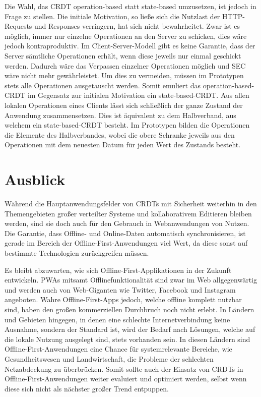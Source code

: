 \documentclass[a4paper, 12pt]{scrreprt}
\begin{document}
Die Wahl, das CRDT operation-based statt state-based umzusetzen, ist jedoch in Frage zu stellen. Die initiale Motivation, so ließe sich die Nutzlast der HTTP-Requests und Responses verringern, hat sich nicht bewahrheitet. Zwar ist es möglich, immer nur einzelne Operationen an den Server zu schicken, dies wäre jedoch kontraproduktiv. Im Client-Server-Modell gibt es keine Garantie, dass der Server sämtliche Operationen erhält, wenn diese jeweils nur einmal geschickt werden. Dadurch wäre das Verpassen einzelner Operationen möglich und \ac{SEC} wäre nicht mehr gewährleistet. Um dies zu vermeiden, müssen im Prototypen stets alle Operationen ausgetauscht werden. Somit emuliert das operation-based-CRDT im Gegensatz zur initialen Motivation ein state-based-CRDT. Aus allen lokalen Operationen eines Clients lässt sich schließlich der ganze Zustand der Anwendung zusammensetzen. Dies ist äquivalent zu dem Halbverband, aus welchem ein state-based-CRDT besteht. Im Prototypen bilden die Operationen die Elemente des Halbverbandes, wobei die obere Schranke jeweils aus den Operationen mit dem neuesten Datum für jeden Wert des Zustands besteht.

\section{Ausblick}

Während die Hauptanwendungsfelder von CRDTs mit Sicherheit weiterhin in den Themengebieten großer verteilter Systeme und kollaborativem Editieren bleiben werden, sind sie doch auch für den Gebrauch in Webanwendungen von Nutzen. Die Garantie, dass Offline- und Online-Daten automatisch synchronisieren, ist gerade im Bereich der Offline-First-Anwendungen viel Wert, da diese sonst auf bestimmte Technologien zurückgreifen müssen.

Es bleibt abzuwarten, wie sich Offline-First-Applikationen in der Zukunft entwickeln. PWAs mitsamt Offlinefunktionalität sind zwar im Web allgegenwärtig und werden auch von Web-Giganten wie Twitter, Facebook und Instagram angeboten. Wahre Offline-First-Apps jedoch, welche offline komplett nutzbar sind, haben den großen kommerziellen Durchbruch noch nicht erlebt. In Ländern und Gebieten hingegen, in denen eine schlechte Internetverbindung keine Ausnahme, sondern der Standard ist, wird der Bedarf nach Lösungen, welche auf die lokale Nutzung ausgelegt sind, stets vorhanden sein. In diesen Ländern sind Offline-First-Anwendungen eine Chance für systemrelevante Bereiche, wie Gesundheitswesen und Landwirtschaft, die Probleme der schlechten Netzabdeckung zu überbrücken. Somit sollte auch der Einsatz von CRDTs in Offline-First-Anwendungen weiter evaluiert und optimiert werden, selbst wenn diese sich nicht als nächster großer Trend entpuppen. 
\end{document}
